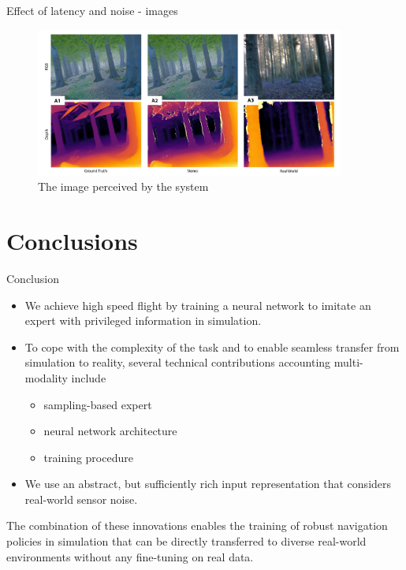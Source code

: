 \documentclass{beamer}
\begin{document}
\begin{frame}{Effect of latency and noise - images}
	\begin{figure}
		\includegraphics[width=4in]{images/stimulation and stereo.png}
		\caption{The image perceived by the system}
	\end{figure}
\end{frame}

\section{Conclusions}
\begin{frame}{Conclusion}
	\begin{itemize}
		\item We achieve high speed flight by training a neural network to imitate an expert with privileged information in simulation.
		
		\item To cope with the complexity of the task and to enable seamless transfer from simulation to reality, several technical contributions accounting multi-modality include
		\begin{itemize}
			\item sampling-based expert
			\item neural network architecture
			\item training procedure
		\end{itemize} 
		
		\item We use an abstract, but sufficiently rich input representation that considers real-world sensor noise.
	\end{itemize}
	The combination of these innovations enables the training of robust navigation policies in simulation that can be directly transferred to diverse real-world environments without any fine-tuning on real data.
	
\end{frame}
\end{document}
